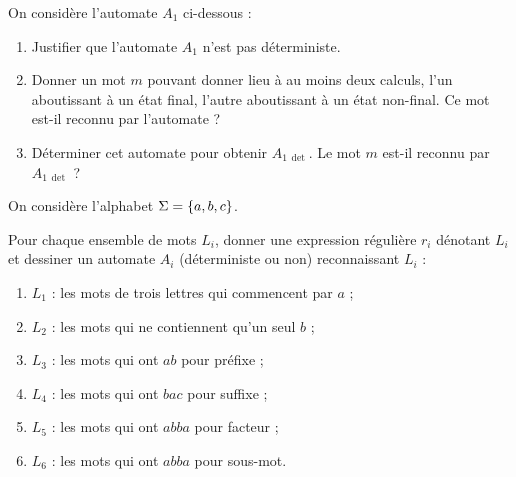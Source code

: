 \begin{exo}
On considère l'automate \(A_1\) ci-dessous :

\begin{center}
\end{center}

\begin{enumerate}
    \item Justifier que l'automate \(A_1\) n'est pas déterministe. \\
    \item Donner un mot \(m\) pouvant donner lieu à au moins deux calculs, l'un aboutissant à un état final, l'autre aboutissant à un état non-final. Ce mot est-il reconnu par l'automate ? \\
    \item Déterminer cet automate pour obtenir \(A_{1\,\det}\). Le mot \(m\) est-il reconnu par \(A_{1\,\det}\) ?
\end{enumerate}
\end{exo}

\begin{corr}
\end{corr}

\begin{exo}
On considère l'alphabet \(\Sigma=\left\lbrace a,b,c\right\rbrace\).

Pour chaque ensemble de mots \(L_i\), donner une expression régulière \(r_i\) dénotant \(L_i\) et dessiner un automate \(A_i\) (déterministe ou non) reconnaissant \(L_i\) :

\begin{enumerate}
    \item \(L_1\) : les mots de trois lettres qui commencent par \(a\) ; \\
    \item \(L_2\) : les mots qui ne contiennent qu'un seul \(b\) ; \\
    \item \(L_3\) : les mots qui ont \(ab\) pour préfixe ; \\
    \item \(L_4\) : les mots qui ont \(bac\) pour suffixe ; \\
    \item \(L_5\) : les mots qui ont \(abba\) pour facteur ; \\
    \item \(L_6\) : les mots qui ont \(abba\) pour sous-mot.
\end{enumerate}
\end{exo}

